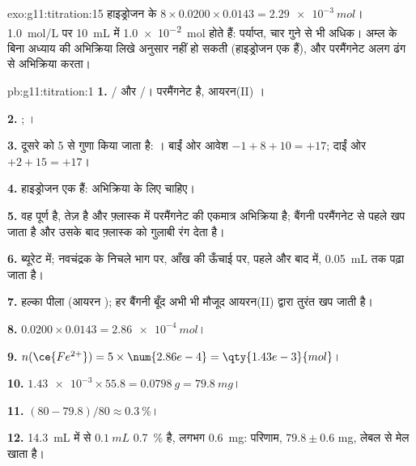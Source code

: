 \begin{solution}{exo:g11:titration:15}
हाइड्रोजन  के $8 \times 0.0200 \times 0.0143 = \qty{2.29e-3}{mol}$।
\qty{1.0}{mol/L} पर \qty{10}{mL} में \qty{1.0e-2}{mol} होते हैं: पर्याप्त, चार गुने से
भी अधिक। अम्ल के बिना अध्याय की अभिक्रिया लिखे अनुसार
नहीं हो सकती (हाइड्रोजन  एक  हैं), और परमैंगनेट
अलग ढंग से अभिक्रिया करता।
\end{solution}

\begin{solution}{pb:g11:titration:1}
\textbf{1.} / और /।
 परमैंगनेट  है,  आयरन(II) ।

\textbf{2.} ;
।

\textbf{3.} दूसरे को 5 से गुणा किया जाता है:
। बाईं ओर
आवेश $-1 + 8 + 10 = +17$; दाईं ओर $+2 + 15 = +17$।

\textbf{4.} हाइड्रोजन  एक  हैं: अभिक्रिया के लिए  चाहिए।

\textbf{5.} वह पूर्ण है, तेज़ है और फ़्लास्क में परमैंगनेट की एकमात्र
अभिक्रिया है; बैंगनी परमैंगनेट  से पहले खप जाता है और
उसके बाद फ़्लास्क को गुलाबी रंग देता है।

\textbf{6.} ब्यूरेट में; नवचंद्रक के निचले भाग पर, आँख की
ऊँचाई पर, पहले और बाद में, \qty{0.05}{mL} तक पढ़ा जाता है।

\textbf{7.} हल्का पीला (आयरन ); हर बैंगनी बूँद अभी भी मौजूद
आयरन(II)  द्वारा तुरंत खप जाती है।

\textbf{8.} $0.0200 \times 0.0143 = \qty{2.86e-4}{mol}$।

\textbf{9.} $n(\ce{Fe^{2+}}) = 5 \times \num{2.86e-4} =
\qty{1.43e-3}{mol}$।

\textbf{10.} $\num{1.43e-3} \times 55.8 = \qty{0.0798}{g} =
\qty{79.8}{mg}$।

\textbf{11.} $(80 - 79.8)/80 \approx \qty{0.3}{\percent}$।

\textbf{12.} \qty{14.3}{mL} में से $\qty{0.1}{mL}$ \qty{0.7}{\percent} है,
लगभग \qty{0.6}{mg}: परिणाम, $79.8 \pm 0.6$ mg, लेबल से
मेल खाता है।


\end{solution}
